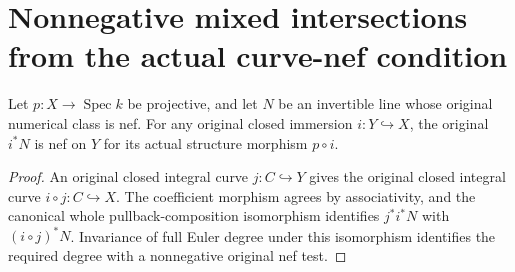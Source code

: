 \section{Nonnegative mixed intersections from the actual curve-nef condition}

\begin{lemma}
\label{lem:native-curve-nef-closed-restriction}
\leanok
{}
Let $p:X\to\operatorname{Spec}k$ be projective, and let $N$ be an
invertible line whose original numerical class is nef. For any original
closed immersion $i:Y\hookrightarrow X$, the original $i^*N$ is nef
on $Y$ for its actual structure morphism $p\circ i$.
\end{lemma}
\begin{proof}
An original closed integral curve $j:C\hookrightarrow Y$ gives the
original closed integral curve $i\circ j:C\hookrightarrow X$.
The coefficient morphism agrees by associativity, and the canonical
whole pullback-composition isomorphism identifies $j^*i^*N$ with
$(i\circ j)^*N$. Invariance of full Euler degree under this isomorphism
identifies the required degree with a nonnegative original nef test.
\end{proof}

